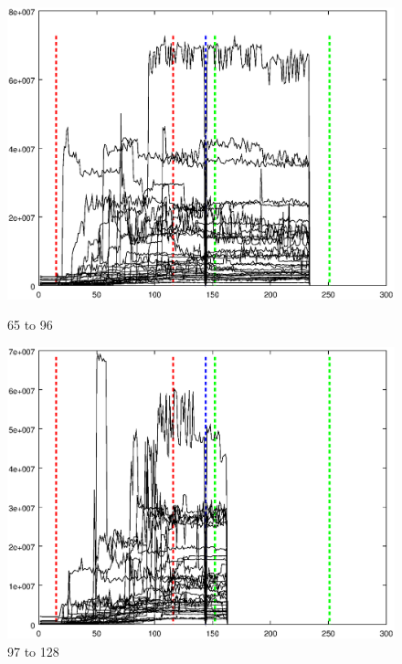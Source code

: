 \documentclass{article}
\begin{document}
\begin{figure}[h]
\centering
\begin{minipage}{.49\textwidth}
	\centering
	\includegraphics[width=0.79\linewidth]{measurement/spad_1-32}
	\caption{65 to 96}
	\label{fig:spad_65-96}
\end{minipage}
\begin{minipage}{.49\textwidth}
	\centering
	\includegraphics[width=0.79\linewidth]{measurement/spad_33-64}
	\caption{97 to 128}
	\label{fig:spad_97-128}
\end{minipage}
\end{figure}
\end{document}
